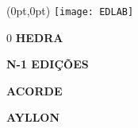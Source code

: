 \begin{textblock*}{5.625in}(0pt,0pt)%
\vspace*{-3cm}
\hspace*{-2.1cm}\texttt{[image: EDLAB]}
\end{textblock*}

\pagebreak

\pagestyle{indice}

{}

\vspace{1.2cm}

{\LARGE

\hspace*{6.8cm}0\pageref{hedra} \textbf{HEDRA}

\hspace*{6.8cm}\pageref{n-1} \textbf{N-1 EDIÇÕES}


\hspace*{6.8cm}\pageref{acorde} \textbf{ACORDE}

\hspace*{6.8cm}\pageref{ayllon} \textbf{AYLLON}\\






}

